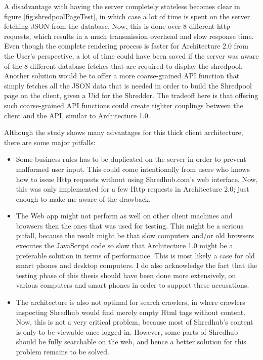 A disadvantage with having the server completely stateless becomes clear in figure \vref{fig:shredpoolPageTest}, in which case a lot of time is spent on the server fetching JSON from the database. Now, this is done over 8 different http requests, which results in a much transmission overhead and slow response time. Even though the complete rendering process is faster for Architecture 2.0 from the User's perspective, a lot of time could have been saved if the server was aware of the 8 different database fetches that are required to display the shredpool. Another solution would be to offer a more coarse-grained API function that simply fetches all the JSON data that is needed in order to build the Shredpool page on the client, given a Uid for the Shredder. The tradeoff here is that offering such coarse-grained API functions could  create tighter couplings between the client and the API, similar to Architecture 1.0.

Although the study shows many advantages for this thick client architecture, there are some major pitfalls:
\begin{itemize}
\item{} Some business rules has to be duplicated on the server in order to prevent malformed user input. This could come intentionally from users who knows how to issue Http requests without using Shredhub.com's web interface. Now, this was only implemented for a few Http requests in Architecture 2.0; just enough to make me aware of the drawback.
\item{} The Web app might not perform as well on other client machines and browsers then the ones that was used for testing. This might be a serious pitfall, because the result might be that slow computers and/or old browsers executes the JavaScript code so slow that Architecture 1.0 might be a preferable solution in terms of performance. This is most likely a case for old smart phones and desktop computers. I do also acknowledge the fact that the testing phase of this thesis should have been done more extensively, on various computers and smart phones in order to support these accusations.
\item{} The architecture is also not optimal for search crawlers, in where crawlers inspecting Shredhub would find merely empty Html tags without content. Now, this is not a very critical problem, because most of Shredhub's content is only to be viewable once logged in. However, some parts of Shredhub should be fully searchable on the web, and hence a better solution for this problem remains to be solved.
\end{itemize}

